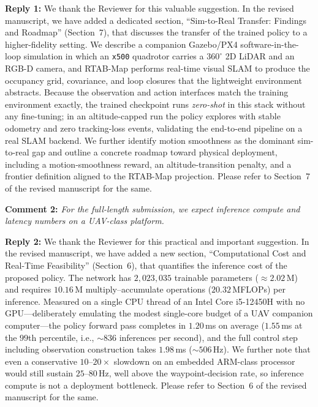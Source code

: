 \documentclass[10pt]{article}
\begin{document}
\hspace{-0.7cm} {{\bf{Reply 1:}} We thank the Reviewer for this valuable suggestion. In the revised manuscript, we have added a dedicated section, ``Sim-to-Real Transfer: Findings and Roadmap'' (Section~7), that discusses the transfer of the trained policy to a higher-fidelity setting. We describe a companion Gazebo/PX4 software-in-the-loop simulation in which an \texttt{x500} quadrotor carries a $360^\circ$ 2D LiDAR and an RGB-D camera, and RTAB-Map performs real-time visual SLAM to produce the occupancy grid, covariance, and loop closures that the lightweight environment abstracts. Because the observation and action interfaces match the training environment exactly, the trained checkpoint runs \emph{zero-shot} in this stack without any fine-tuning; in an altitude-capped run the policy explores with stable odometry and zero tracking-loss events, validating the end-to-end pipeline on a real SLAM backend. We further identify motion smoothness as the dominant sim-to-real gap and outline a concrete roadmap toward physical deployment, including a motion-smoothness reward, an altitude-transition penalty, and a frontier definition aligned to the RTAB-Map projection. Please refer to Section~7 of the revised manuscript for the same.

\hspace{-0.7cm} {\bf Comment 2:}{\it{ For the full-length submission, we expect inference compute and latency numbers on a UAV-class platform.
}}

\hspace{-0.7cm} {{\bf{Reply 2:}} We thank the Reviewer for this practical and important suggestion. In the revised manuscript, we have added a new section, ``Computational Cost and Real-Time Feasibility'' (Section~6), that quantifies the inference cost of the proposed policy. The network has $2{,}023{,}035$ trainable parameters ($\approx\!2.02$\,M) and requires $10.16$\,M multiply--accumulate operations ($20.32$\,MFLOPs) per inference. Measured on a single CPU thread of an Intel Core i5-12450H with no GPU---deliberately emulating the modest single-core budget of a UAV companion computer---the policy forward pass completes in $1.20$\,ms on average ($1.55$\,ms at the $99$th percentile, i.e., ${\sim}836$ inferences per second), and the full control step including observation construction takes $1.98$\,ms (${\sim}506$\,Hz). We further note that even a conservative $10$--$20\times$ slowdown on an embedded ARM-class processor would still sustain $25$--$80$\,Hz, well above the waypoint-decision rate, so inference compute is not a deployment bottleneck. Please refer to Section~6 of the revised manuscript for the same.

}}
\end{document}
